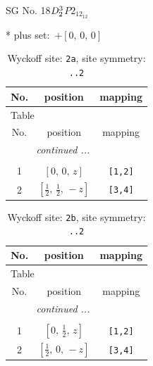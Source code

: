\documentclass[fleqn,8pt]{jsarticle}
\begin{document}
\setcounter{MaxMatrixCols}{32}

\renewcommand{\tablename}{Table~}
\renewcommand{\figurename}{Figure~}
\begin{center}
\LARGE
SG No. 18\quad$D_{\rm 2}^{3}$\quad$P2_12_12$\quad[ orthorhombic ]
\end{center}
* plus set:\,\,\,$+\left[ 0,\, 0,\, 0 \right]$
\renewcommand{\arraystretch}{1.2}
\begin{longtable}{ccc}
\caption{Wyckoff site: {\tt 2a}, site symmetry: {\tt ..2}}
 \\
 \hline \hline
No. & position & mapping \\ \hline \endfirsthead

\multicolumn{2}{l}{\tablename\ \thetable{}} \\
 \hline \hline
No. & position & mapping \\ \hline \endhead

 \hline \hline
\multicolumn{2}{r}{\footnotesize\it continued ...} \\ \endfoot

 \hline \hline
\multicolumn{2}{r}{} \\ \endlastfoot

1 & $\left[ 0,\, 0,\, z \right]$ & {\tt [1,2]} \\ \hline
2 & $\left[ \frac{1}{2},\, \frac{1}{2},\, - z \right]$ & {\tt [3,4]} \\
\end{longtable}
\renewcommand{\arraystretch}{1.2}
\begin{longtable}{ccc}
\caption{Wyckoff site: {\tt 2b}, site symmetry: {\tt ..2}}
 \\
 \hline \hline
No. & position & mapping \\ \hline \endfirsthead

\multicolumn{2}{l}{\tablename\ \thetable{}} \\
 \hline \hline
No. & position & mapping \\ \hline \endhead

 \hline \hline
\multicolumn{2}{r}{\footnotesize\it continued ...} \\ \endfoot

 \hline \hline
\multicolumn{2}{r}{} \\ \endlastfoot

1 & $\left[ 0,\, \frac{1}{2},\, z \right]$ & {\tt [1,2]} \\ \hline
2 & $\left[ \frac{1}{2},\, 0,\, - z \right]$ & {\tt [3,4]} \\
\end{longtable}
\end{document}
